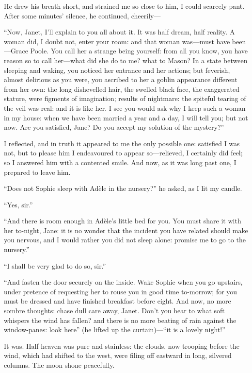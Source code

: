 He drew his breath short, and strained me so close to him, I could
scarcely pant.  After some minutes' silence, he continued, cheerily---

\enquote{Now, Janet, I'll explain to you all about it.  It was half
	dream, half reality.  A woman did, I doubt not, enter your room: and
	that woman was---must have been---Grace Poole.  You call her a strange
	being yourself: from all you know, you have reason so to call her---what
	did she do to me? what to Mason?  In a state between sleeping and
	waking, you noticed her entrance and her actions; but feverish, almost
	delirious as you were, you ascribed to her a goblin appearance different
	from her own: the long dishevelled hair, the swelled black face, the
	exaggerated stature, were figments of imagination; results of nightmare:
	the spiteful tearing of the veil was real: and it is like her.  I see
	you would ask why I keep such a woman in my house: when we have been
	married a year and a day, I will tell you; but not now.  Are you
	satisfied, Jane?  Do you accept my solution of the mystery?}

I reflected, and in truth it appeared to me the only possible one:
satisfied I was not, but to please him I endeavoured to appear
so---relieved, I certainly did feel; so I answered him with a contented
smile.  And now, as it was long past one, I prepared to leave him.

\enquote{Does not Sophie sleep with Adèle in the nursery?} he asked, as
I lit my candle.

\enquote{Yes, sir.}

\enquote{And there is room enough in Adèle's little bed for you.  You
	must share it with her to-night, Jane: it is no wonder that the incident
	you have related should make you nervous, and I would rather you did not
	sleep alone: promise me to go to the nursery.}

\enquote{I shall be very glad to do so, sir.}

\enquote{And fasten the door securely on the inside.  Wake Sophie when
	you go upstairs, under pretence of requesting her to rouse you in good
	time to-morrow; for you must be dressed and have finished breakfast
	before eight.  And now, no more sombre thoughts: chase dull care away,
	Janet.  Don't you hear to what soft whispers the wind has fallen? and
	there is no more beating of rain against the window-panes: look here}
(he lifted up the curtain)---\enquote{it is a lovely night!}

It was.  Half heaven was pure and stainless: the clouds, now trooping
before the wind, which had shifted to the west, were filing off eastward
in long, silvered columns.  The moon shone peacefully.

